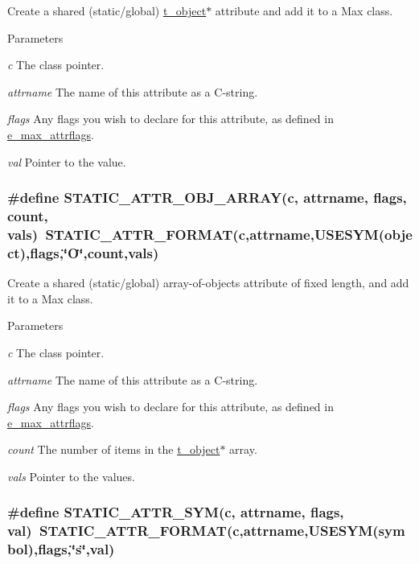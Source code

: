 Create a shared (static/global) \hyperlink{structt__object}{t\_\-object}$\ast$ attribute and add it to a Max class. 
\begin{DoxyParams}{Parameters}
\item[{\em c}]The class pointer. \item[{\em attrname}]The name of this attribute as a C-\/string. \item[{\em flags}]Any flags you wish to declare for this attribute, as defined in \hyperlink{group__attr_gaf296cfc6741bb19207f6ed8062809115}{e\_\-max\_\-attrflags}. \item[{\em val}]Pointer to the value. \end{DoxyParams}
\hypertarget{group__attr_ga93ab45fd95fa4111393a7c68ff7492c8}{
\subsubsection[{STATIC\_\-ATTR\_\-OBJ\_\-ARRAY}]{\setlength{\rightskip}{0pt plus 5cm}\#define STATIC\_\-ATTR\_\-OBJ\_\-ARRAY(c, \/  attrname, \/  flags, \/  count, \/  vals)~STATIC\_\-ATTR\_\-FORMAT(c,attrname,USESYM(object),flags,\char`\"{}O\char`\"{},count,vals)}}
\label{group__attr_ga93ab45fd95fa4111393a7c68ff7492c8}


Create a shared (static/global) array-\/of-\/objects attribute of fixed length, and add it to a Max class. 
\begin{DoxyParams}{Parameters}
\item[{\em c}]The class pointer. \item[{\em attrname}]The name of this attribute as a C-\/string. \item[{\em flags}]Any flags you wish to declare for this attribute, as defined in \hyperlink{group__attr_gaf296cfc6741bb19207f6ed8062809115}{e\_\-max\_\-attrflags}. \item[{\em count}]The number of items in the \hyperlink{structt__object}{t\_\-object}$\ast$ array. \item[{\em vals}]Pointer to the values. \end{DoxyParams}
\hypertarget{group__attr_ga315d33e09177e091dc07758755993f0b}{
\subsubsection[{STATIC\_\-ATTR\_\-SYM}]{\setlength{\rightskip}{0pt plus 5cm}\#define STATIC\_\-ATTR\_\-SYM(c, \/  attrname, \/  flags, \/  val)~STATIC\_\-ATTR\_\-FORMAT(c,attrname,USESYM(symbol),flags,\char`\"{}s\char`\"{},val)}}
\label{group__attr_ga315d33e09177e091dc07758755993f0b}


